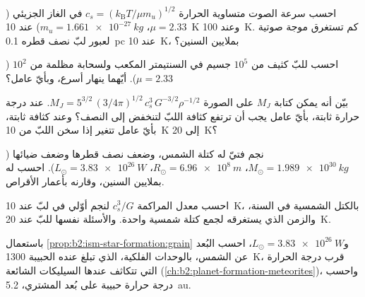\begin{exercise}[$\star$]\label{exo:b2:ism-star-formation:3}
احسب سرعة الصوت متساوية الحرارة $c_s = (k_{\mathrm B}T/\mu m_u)^{1/2}$ في
الغاز الجزيئي ($\mu = 2.33$، $m_u = \qty{1.661e-27}{kg}$) عند \qty{10}{K} وعند
\qty{100}{K}. كم تستغرق موجة صوتية لعبور لبّ نصف قطره
\qty{0.1}{pc} عند \qty{10}{K}، بملايين السنين؟
\end{exercise}

\begin{exercise}[$\star$]\label{exo:b2:ism-star-formation:4}
احسب  للبّ كثيف من $10^5$ جسيم في السنتيمتر
المكعب ولسحابة مظلمة من $10^2$ ($\mu = 2.33$). أيّهما ينهار
أسرع، وبأيّ عامل؟
\end{exercise}

\begin{exercise}[$\star\star$]\label{exo:b2:ism-star-formation:5}
بيّن أنه يمكن كتابة $M_J$ على الصورة $M_J = 5^{3/2}\,(3/4\pi)^{1/2}\,c_s^3\,G^{-3/2}\rho^{-1/2}$.
عند درجة حرارة ثابتة، بأيّ عامل يجب أن ترتفع كثافة اللبّ لتنخفض
 إلى النصف؟ وعند كثافة ثابتة، بأيّ عامل تتغير  إذا
سخن اللبّ من \qty{10}{K} إلى \qty{20}{K}؟
\end{exercise}

\begin{exercise}[$\star\star$]\label{exo:b2:ism-star-formation:6}
نجم فتيّ له كتلة الشمس، وضعف نصف قطرها وضعف ضيائها
($M_\odot = \qty{1.989e30}{kg}$، $R_\odot = \qty{6.96e8}{m}$،
$L_\odot = \qty{3.83e26}{W}$). احسب  له بملايين
السنين، وقارنه بأعمار الأقراص.
\end{exercise}

\begin{exercise}[$\star\star$]\label{exo:b2:ism-star-formation:7}
احسب معدل المراكمة $c_s^3/G$ لنجم أوّلي في لبّ عند \qty{10}{K}، بالكتل
الشمسية في السنة، والزمن الذي يستغرقه لجمع كتلة شمسية واحدة. والأسئلة
نفسها للبّ عند \qty{20}{K}.
\end{exercise}

\begin{exercise}[$\star\star$]\label{exo:b2:ism-star-formation:8}
باستعمال \cref{prop:b2:ism-star-formation:grain} و$L_\odot = \qty{3.83e26}{W}$،
احسب البُعد عن الشمس، بالوحدات الفلكية، الذي تبلغ عنده الحبيبة
\qty{1300}{K}، قرب درجة الحرارة التي تتكاثف عندها السيليكات الشائعة
(\cref{ch:b2:planet-formation-meteorites})، واحسب
درجة حرارة حبيبة على بُعد المشتري، \qty{5.2}{au}.
\end{exercise}

